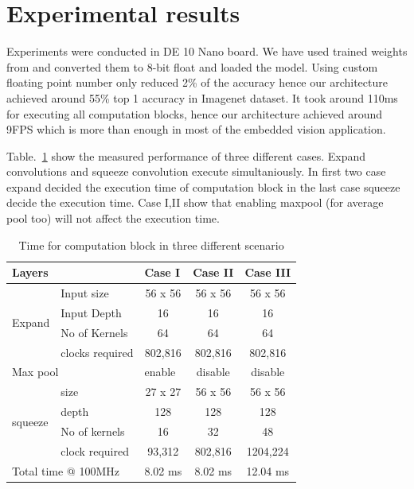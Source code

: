 \documentclass[conference]{IEEEtran}
\begin{document}
\section{Experimental results}\label{SCM}


Experiments were conducted in DE 10 Nano board. We have used trained weights from \cite{weight} and converted them to 8-bit float and loaded the model. Using custom floating point number only reduced 2\% of the accuracy hence our architecture achieved around 55\% top 1 accuracy in Imagenet dataset. It took around 110ms for executing all computation blocks, hence our architecture achieved around 9FPS which is more than enough in most of the embedded vision application.

Table.~\ref{tab2} show the measured performance of three different cases. Expand convolutions and squeeze convolution execute simultaniously. In first two case expand decided the execution time of computation block in the last case squeeze decide the execution time. Case I,II show that enabling maxpool (for average pool too) will not affect the execution time.


\begin{table}[htbp]
\caption{Time for computation block in three different scenario}
\begin{tabular}{|l|l|c|c|c|}
\hline
\multicolumn{2}{|l|}{Layers}               & \multicolumn{1}{l|}{Case I}  & Case II & Case III \\ \hline
\multirow{4}{*}{Expand}  & Input size      & 56 x 56                      & 56 x 56 & 56 x 56  \\ \cline{2-5} 
                         & Input Depth     & 16                           & 16      & 16       \\ \cline{2-5} 
                         & No of Kernels   & 64                           & 64      & 64       \\ \cline{2-5} 
                         & clocks required & 802,816                      & 802,816 & 802,816  \\ \hline
\multicolumn{2}{|l|}{Max pool}             & \multicolumn{1}{l|}{enable}  & disable & disable  \\ \hline
\multirow{4}{*}{squeeze} & size            & 27 x 27                      & 56 x 56 & 56 x 56  \\ \cline{2-5} 
                         & depth           & 128                          & 128     & 128      \\ \cline{2-5} 
                         & No of kernels   & 16                           & 32      & 48       \\ \cline{2-5} 
                         & clock required  & 93,312                       & 802,816 & 1204,224 \\ \hline
\multicolumn{2}{|l|}{Total time @ 100MHz}  & \multicolumn{1}{l|}{8.02 ms} & 8.02 ms & 12.04 ms \\ \hline
\end{tabular}
  \label{tab2}
\end{table}
\end{document}
